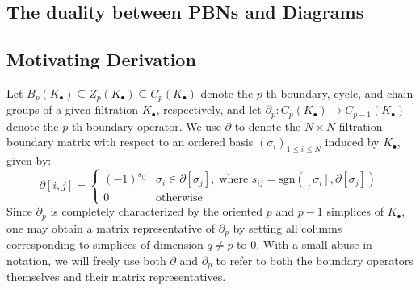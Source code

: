 \documentclass[10pt]{article}
\numberwithin{equation}{section}
\newcommand{\+}{%
	\raisebox{0.18ex}{\scaleobj{0.55}{+}}
}
\theoremstyle{definition}
\begin{document}
\subsection{The duality between PBNs and Diagrams}\label{sec:duality_pbn_dgm}



\subsection{Motivating Derivation}\label{sec:betti_derivation}

Let $B_p(K_\bullet) \subseteq Z_p(K_\bullet) \subseteq C_p(K_\bullet)$ denote the $p$-th boundary, cycle, and chain groups of a given filtration $K_\bullet$, respectively, and let $\partial_p : C_p( K_{\bullet}) \to C_{p-1}(K_{\bullet})$ denote the $p$-th boundary operator. 
We use $\partial$ to denote the $N \times N$ filtration boundary matrix with respect to an ordered basis $(\sigma_i)_{1 \leq i \leq N}$ induced by $K_\bullet$, given by:
\begin{equation}\label{eq:boundary_matrix}
	\partial[i,j] = \begin{cases}
		(-1)^{s_{ij}} & \sigma_i \in \partial[\sigma_j], \; \text{where } s_{ij} = \mathrm{sgn}([\sigma_i], \partial [\sigma_j])  \\
		0 & \text{otherwise}
	\end{cases}
\end{equation}
Since $\partial_p$ is completely characterized by the oriented $p$ and $p-1$ simplices of $K_\bullet$,  one may obtain a matrix representative of $\partial_p$ by setting all columns corresponding to simplices of dimension $q \neq p$ to $0$. 
With a small abuse in notation, we will freely use both $\partial$ and $\partial_p$ to refer to both the boundary operators themselves and their matrix representatives.
\end{document}
